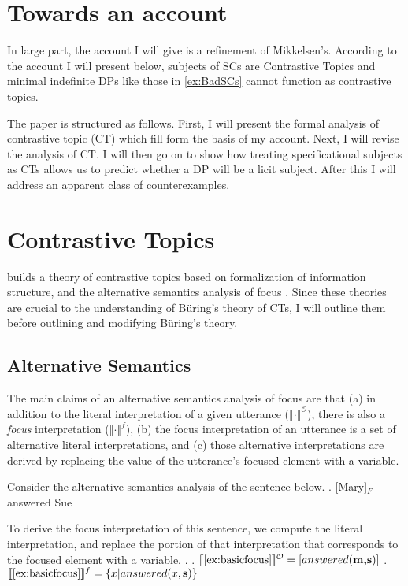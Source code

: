 \documentclass[letterpaper]{article}
\begin{document}
\section{Towards an account}
In large part, the account I will give is a refinement of Mikkelsen's.
According to the account I will present below, subjects of SCs are Contrastive Topics \parencite[in the sense of][]{buring2003d} and minimal indefinite DPs like those in \ref{ex:BadSCs} cannot function as contrastive topics.

The paper is structured as follows.
First, I will present the formal analysis of contrastive topic (CT) which fill form the basis of my account.
Next, I will revise the analysis of CT.
I will then go on to show how treating specificational subjects as CTs allows us to predict whether a DP will be a licit subject.
After this I will address an apparent class of counterexamples.

\section{Contrastive Topics}
\textcite{buring2003d} builds a theory of contrastive topics based on  formalization of information structure, and the alternative semantics analysis of focus \parencite{rooth1992theory}.
Since these theories are crucial to the understanding of B\"uring's theory of CTs, I will outline them before outlining and modifying B\"uring's theory.

\subsection{Alternative Semantics}
The main claims of an alternative semantics analysis of focus are that (a) in addition to the literal interpretation of a given utterance ($\llbracket \cdot \rrbracket^\mathcal{O}$), there is also a \textit{focus} interpretation ($\llbracket \cdot \rrbracket^f$), (b) the focus interpretation of an utterance is a set of alternative literal interpretations, and (c) those alternative interpretations are derived by replacing the value of the utterance's focused element with a variable.

Consider the alternative semantics analysis of the sentence below.
\ex.\label{ex:basicfocus} [Mary]$_F$ answered Sue

To derive the focus interpretation of this sentence, we compute the literal interpretation, and replace the portion of that interpretation that corresponds to the focused element with a variable.
\ex.
\a. $\llbracket \text{\ref{ex:basicfocus}}\rrbracket^\mathcal{O} = [answered(\textbf{m,s})]$
\b. $\llbracket \text{\ref{ex:basicfocus}}\rrbracket^f = \left\{ x | answered(x,\textbf{s}) \right\}$
\end{document}
